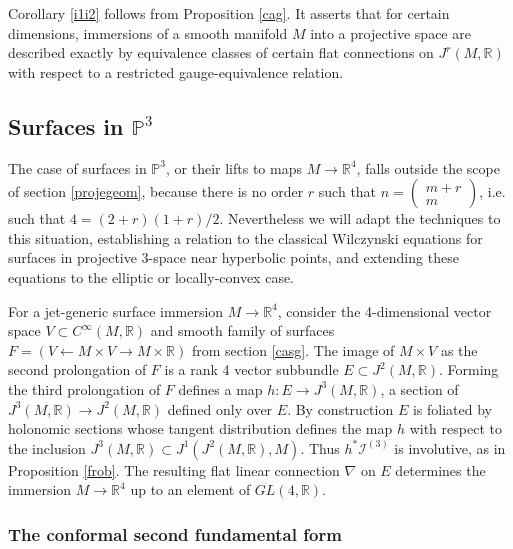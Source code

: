 \documentclass[12pt]{article}
\numberwithin{equation}{section}
\theoremstyle{plain}
\theoremstyle{definition}
\renewcommand{\P}{\mathbb{P}}
\newcommand{\GL}{GL}
\newcommand{\R}{\mathbb{R}}
\newcommand{\la}{\leftarrow}
\newcommand{\ra}{\rightarrow}
\begin{document}
Corollary \ref{i1i2} follows from Proposition \ref{cag}. It asserts that for certain dimensions, immersions of a smooth manifold $M$ into a projective space are described exactly by equivalence classes of certain flat connections on $J^{r}(M,\R)$ with respect to a restricted gauge-equivalence relation.

\subsection{Surfaces in $\P^{3}$}\label{projemb}

The case of surfaces in $\P^{3}$, or their lifts to maps $M\ra \R^{4}$, falls outside the scope of section \ref{projegeom}, because there is no order $r$ such that $n=\begin{pmatrix}m+r \\ m\end{pmatrix}$, i.e. such that $4=(2+r)(1+r)/2$. Nevertheless we will adapt the techniques to this situation, establishing a relation to the classical Wilczynski equations for surfaces in projective 3-space near hyperbolic points, and extending these equations to the elliptic or locally-convex case.

For a jet-generic surface immersion $M\ra \R^{4}$, consider the 4-dimensional vector space $V\subset C^{\infty}(M,\R)$ and smooth family of surfaces $F=(V\la M\times V \ra M\times \R)$ from section \ref{casg}. The image of $M\times V$ as the second prolongation of $F$ is a rank 4 vector subbundle $E\subset J^{2}(M,\R)$. Forming the third prolongation of $F$ defines a map $h:E\ra J^{3}(M,\R)$, a section of $J^{3}(M,\R)\ra J^{2}(M,\R)$ defined only over $E$. By construction $E$ is foliated by holonomic sections whose tangent distribution defines the map $h$ with respect to the inclusion $J^{3}(M,\R)\subset J^{1}(J^{2}(M,\R),M)$. Thus $h^{*}\mathcal{I}^{(3)}$ is involutive, as in Proposition \ref{frob}. The resulting flat linear connection $\nabla$ on $E$ determines the immersion $M\ra \R^{4}$ up to an element of $\GL(4,\R)$.

\subsubsection{The conformal second fundamental form}
\end{document}
